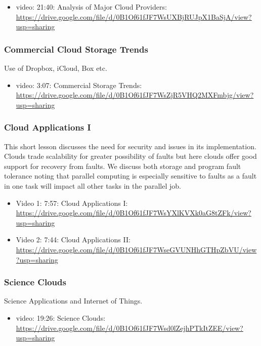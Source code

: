 \begin{itemize}
\tightlist
\item
  video: 21:40: Analysis of Major Cloud Providers:
  \url{https://drive.google.com/file/d/0B1Of61fJF7WsUXBjRUJpX1BaSjA/view?usp=sharing}
\end{itemize}

\subsubsection{Commercial Cloud Storage Trends}\label{commercial-cloud-storage-trends}

Use of Dropbox, iCloud, Box etc.

\begin{itemize}
\item
  video: 3:07: Commercial Storage Trends:
  \url{https://drive.google.com/file/d/0B1Of61fJF7WsZjR5VHQ2MXFmbjg/view?usp=sharing}
\end{itemize}

\subsubsection{Cloud Applications I}\label{cloud-applications-i}

This short lesson discusses the need for security and issues in its
implementation. Clouds trade scalability for greater possibility of
faults but here clouds offer good support for recovery from faults. We
discuss both storage and program fault tolerance noting that parallel
computing is especially sensitive to faults as a fault in one task will
impact all other tasks in the parallel job.

\begin{itemize}
\item
  Video 1: 7:57: Cloud Applications I:
  \url{https://drive.google.com/file/d/0B1Of61fJF7WsYXlKVXk0aG8tZFk/view?usp=sharing}
\item
  Video 2: 7:44: Cloud Applications II:
  \url{https://drive.google.com/file/d/0B1Of61fJF7WseGVUNHhGTHpZbVU/view?usp=sharing}
\end{itemize}

\subsubsection{Science Clouds}\label{science-clouds}

Science Applications and Internet of Things.

\begin{itemize}
\tightlist
\item
  video: 19:26: Science Clouds:
  \url{https://drive.google.com/file/d/0B1Of61fJF7Wsd0lZejhPTkItZEE/view?usp=sharing}
\end{itemize}

